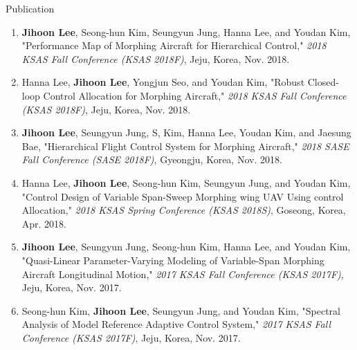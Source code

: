 \documentclass{resume}
\begin{document}
\begin{rSection}{Publication}
\begin{enumerate}
		\item \textbf{\color{coolblack}Jihoon Lee}, Seong-hun Kim, Seungyun Jung, Hanna Lee, and Youdan Kim, "Performance Map of Morphing Aircraft for Hierarchical Control," \textit{2018 KSAS Fall Conference (KSAS 2018F)}, Jeju, Korea, Nov. 2018. 
		
		\item Hanna Lee, \textbf{\color{coolblack}Jihoon Lee}, Yongjun Seo, and Youdan Kim, "Robust Closed-loop Control Allocation for Morphing Aircraft," \textit{2018 KSAS Fall Conference (KSAS 2018F)}, Jeju, Korea, Nov. 2018. 
		
		\item \textbf{\color{coolblack}Jihoon Lee}, Seungyun Jung, S, Kim, Hanna Lee, Youdan Kim, and Jaesung Bae, "Hierarchical Flight Control System for Morphing Aircraft," \textit{2018 SASE Fall Conference (SASE 2018F)}, Gyeongju, Korea, Nov. 2018. 
		\newline[\href{http://sase.or.kr/publication/fileopen2.asp?f_v=2035}{Link}] 
		
		\item Hanna Lee, \textbf{\color{coolblack}Jihoon Lee}, Seong-hun Kim, Seungyun Jung, and Youdan Kim, "Control Design of Variable Span-Sweep Morphing wing UAV Using control Allocation," \textit{2018 KSAS Spring Conference (KSAS 2018S)}, Goseong, Korea, Apr. 2018. 
		
		\item \textbf{\color{coolblack}Jihoon Lee}, Seungyun Jung, Seong-hun Kim, Hanna Lee, and Youdan Kim, "Quasi-Linear Parameter-Varying Modeling of Variable-Span Morphing Aircraft Longitudinal Motion," \textit{2017 KSAS Fall Conference (KSAS 2017F)}, Jeju, Korea, Nov. 2017. 

		\item Seong-hun Kim, \textbf{\color{coolblack}Jihoon Lee}, Seungyun Jung, and Youdan Kim, "Spectral Analysis of Model Reference Adaptive Control System," \textit{2017 KSAS Fall Conference (KSAS 2017F)}, Jeju, Korea, Nov. 2017. 
		

\end{enumerate}
\end{rSection}
\end{document}
